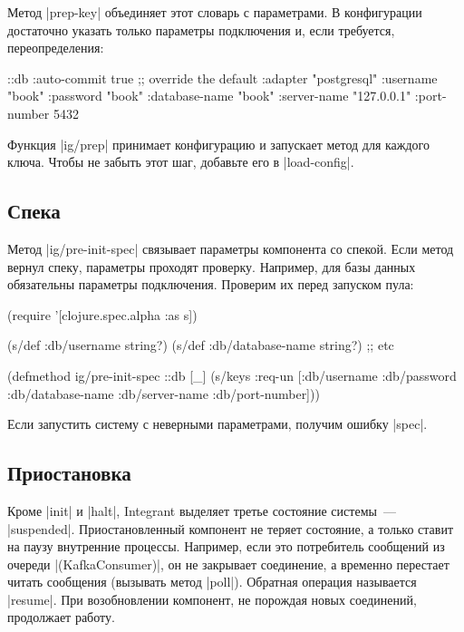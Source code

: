 Метод \spverb|prep-key| объединяет этот словарь с параметрами. В конфигурации
достаточно указать только параметры подключения и, если требуется,
переопределения:

\begin{english}
  \begin{clojure}
{::db {:auto-commit   true ;; override the default
       :adapter       "postgresql"
       :username      "book"
       :password      "book"
       :database-name "book"
       :server-name   "127.0.0.1"
       :port-number   5432}}
  \end{clojure}
\end{english}

Функция \spverb|ig/prep| принимает конфигурацию и запускает метод для каждого
ключа. Чтобы не забыть этот шаг, добавьте его в \spverb|load-config|.

\subsection{Спека}

Метод \spverb|ig/pre-init-spec| связывает параметры компонента со спекой. Если
метод вернул спеку, параметры проходят проверку. Например, для базы данных
обязательны параметры подключения. Проверим их перед запуском пула:

\begin{english}
  \begin{clojure}
(require '[clojure.spec.alpha :as s])

(s/def :db/username string?)
(s/def :db/database-name string?)
;; etc

(defmethod ig/pre-init-spec ::db [_]
  (s/keys :req-un [:db/username
                   :db/password
                   :db/database-name
                   :db/server-name
                   :db/port-number]))
  \end{clojure}
\end{english}

Если запустить систему с неверными параметрами, получим ошибку \spverb|spec|.

\subsection{Приостановка}

Кроме \spverb|init| и \spverb|halt|, Integrant выделяет третье
состояние системы~--- \spverb|suspended|. Приостановленный компонент не теряет
состояние, а только ставит на паузу внутренние процессы. Например, если это
потребитель сообщений из очереди \spverb|(KafkaConsumer)|, он не закрывает
соединение, а временно перестает читать сообщения (вызывать метод
\spverb|poll|). Обратная операция называется \spverb|resume|. При возобновлении
компонент, не порождая новых соединений, продолжает работу.

